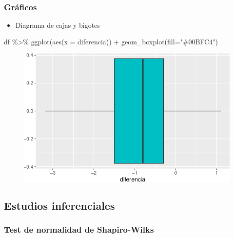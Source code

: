 \documentclass[
  a4paper,
]{scrreport}
\newenvironment{Shaded}{\begin{snugshade}}{\end{snugshade}}
\newcommand{\AttributeTok}[1]{\textcolor[rgb]{0.40,0.45,0.13}{#1}}
\newcommand{\FunctionTok}[1]{\textcolor[rgb]{0.28,0.35,0.67}{#1}}
\newcommand{\NormalTok}[1]{\textcolor[rgb]{0.00,0.23,0.31}{#1}}
\newcommand{\SpecialCharTok}[1]{\textcolor[rgb]{0.37,0.37,0.37}{#1}}
\newcommand{\StringTok}[1]{\textcolor[rgb]{0.13,0.47,0.30}{#1}}
\providecommand{\tightlist}{%
  \setlength{\itemsep}{0pt}\setlength{\parskip}{0pt}}\usepackage{longtable,booktabs,array}
\theoremstyle{definition}
\theoremstyle{definition}
\theoremstyle{remark}
\begin{document}
\hypertarget{gruxe1ficos-3}{%
\subsubsection{Gráficos}\label{gruxe1ficos-3}}

\begin{itemize}
\tightlist
\item
  Diagrama de cajas y bigotes
\end{itemize}

\begin{Shaded}
\begin{Highlighting}[]
\NormalTok{df }\SpecialCharTok{\%\textgreater{}\%} \FunctionTok{ggplot}\NormalTok{(}\FunctionTok{aes}\NormalTok{(}\AttributeTok{x =}\NormalTok{ diferencia)) }\SpecialCharTok{+} 
  \FunctionTok{geom\_boxplot}\NormalTok{(}\AttributeTok{fill=}\StringTok{"\#00BFC4"}\NormalTok{)}
\end{Highlighting}
\end{Shaded}

\begin{figure}[H]

{\centering \includegraphics{./08-analisis-estadisticos_files/figure-pdf/unnamed-chunk-40-1.pdf}

}

\end{figure}

\hypertarget{estudios-inferenciales-3}{%
\subsection{Estudios inferenciales}\label{estudios-inferenciales-3}}

\hypertarget{test-de-normalidad-de-shapiro-wilks-1}{%
\subsubsection{Test de normalidad de
Shapiro-Wilks}\label{test-de-normalidad-de-shapiro-wilks-1}}
\end{document}
